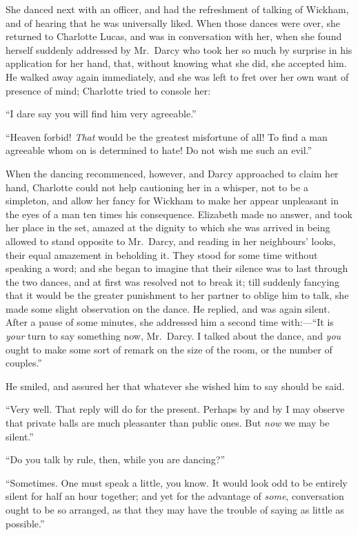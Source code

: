 She danced next with an officer, and had the refreshment of
talking of Wickham, and of hearing that he was universally liked.
When those dances were over, she returned to Charlotte Lucas,
and was in conversation with her, when she found herself
suddenly addressed by Mr.\ Darcy who took her so much by surprise
in his application for her hand, that, without knowing what she
did, she accepted him.  He walked away again immediately, and
she was left to fret over her own want of presence of mind;
Charlotte tried to console her:

``I dare say you will find him very agreeable.''

``Heaven forbid!  \emph{That} would be the greatest misfortune of all!
To find a man agreeable whom on is determined to hate!  Do not
wish me such an evil.''

When the dancing recommenced, however, and Darcy approached to
claim her hand, Charlotte could not help cautioning her in a
whisper, not to be a simpleton, and allow her fancy for Wickham
to make her appear unpleasant in the eyes of a man ten times his
consequence.  Elizabeth made no answer, and took her place in
the set, amazed at the dignity to which she was arrived in being
allowed to stand opposite to Mr.\ Darcy, and reading in her
neighbours' looks, their equal amazement in beholding it.  They
stood for some time without speaking a word; and she began to
imagine that their silence was to last through the two dances,
and at first was resolved not to break it; till suddenly
fancying that it would be the greater punishment to her partner
to oblige him to talk, she made some slight observation on the
dance.  He replied, and was again silent.  After a pause of
some minutes, she addressed him a second time with:---``It is
\emph{your} turn to say something now, Mr.\ Darcy.  I talked about
the dance, and \emph{you} ought to make some sort of remark on the
size of the room, or the number of couples.''

He smiled, and assured her that whatever she wished him to say
should be said.

``Very well.  That reply will do for the present.  Perhaps by and
by I may observe that private balls are much pleasanter than
public ones.  But \emph{now} we may be silent.''

``Do you talk by rule, then, while you are dancing?''

``Sometimes.  One must speak a little, you know.  It would look
odd to be entirely silent for half an hour together; and yet for
the advantage of \emph{some}, conversation ought to be so arranged, as
that they may have the trouble of saying as little as possible.''

